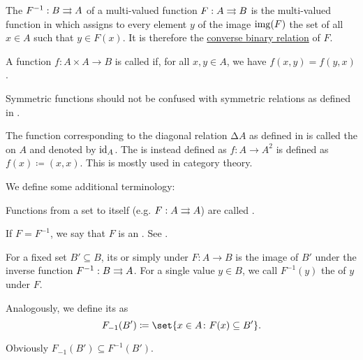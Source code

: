 \begin{definition}
\begin{thmenum}[resume=def:multi_valued_function]
     The  \( F^{-1}: B \rightrightarrows A \) of a multi-valued function \( F: A \rightrightarrows B \) is the multi-valued function in which assigns to every element \( y \) of the image \( \operatorname{img}(F) \) the set of all \( x \in A \) such that \( y \in F(x) \). It is therefore the \hyperref[def:binary_relation/converse]{converse binary relation} of \( F \).

     A function \( f: A \times A \to B \) is called  if, for all \( x, y \in A \), we have \( f(x, y) = f(y, x) \).

    Symmetric functions should not be confused with symmetric relations as defined in .

     The function corresponding to the diagonal relation \( \increment A \) as defined in  is called the  on \( A \) and denoted by \( \operatorname{id}_A \). The  is instead defined as \( f: A \to A^2 \) is defined as \( f(x) \coloneqq (x, x) \). This is mostly used in category theory.
  \end{thmenum}

  We define some additional terminology:
  \begin{thmenum}[resume=def:multi_valued_function]
     Functions from a set to itself (e.g. \( F: A \rightrightarrows A \)) are called .

     If \( F = F^{-1} \), we say that \( F \) is an . See .

     For a fixed set \( B' \subseteq B \), its  or simply  under \( F: A \to B \) is the image of \( B' \) under the inverse function \( F^{-1}: B \rightrightarrows A \). For a single value \( y \in B \), we call \( F^{-1}(y) \) the  of \( y \) under \( F \).

     Analogously, we define its  as
    \begin{equation*}
      F_{-1}(B') \coloneqq \set{ x \in A \colon F(x) \subseteq B' }.
    \end{equation*}

    Obviously \( F_{-1}(B') \subseteq F^{-1}(B') \).
  \end{thmenum}
\end{definition}

